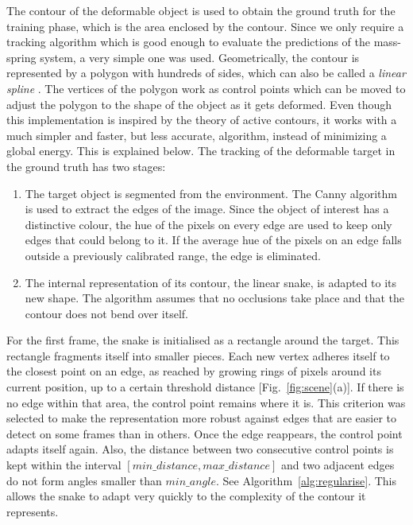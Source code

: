 \documentclass[journal]{IEEEtran}
\newcommand{\fref}[1]{Fig.~\ref{#1}}
\newcommand{\alref}[1]{Algorithm~\ref{#1}}
\newcounter{algorithm}
\newcommand{\comment}[1]{{\color{red} #1}}
\begin{document}
The contour of the deformable object is used to obtain the ground truth for the training phase, which is the area enclosed by the contour. \comment{Since we only require a tracking algorithm which is good enough to evaluate the predictions of the mass-spring system, a very simple one was used.}  Geometrically, the contour is represented by a polygon with hundreds of sides, which can also be called a \textit{linear spline} \comment{\cite{Menet1991}. The vertices of the polygon work as control points which can be moved to adjust the polygon to the shape of the object as it gets deformed.  Even though this implementation is inspired by the theory of active contours, it works with a much simpler and faster, but less accurate, algorithm, instead of minimizing a global energy. This is explained below.}  The tracking of the deformable target in the ground truth has two stages:
\begin{enumerate}
 \item The target object is segmented from the environment.  The Canny algorithm is used to extract the edges of the image.  \comment{  Since the object of interest has a distinctive colour, the hue of the pixels on every edge are used to keep only edges that could belong to it.  If the average hue of the pixels on an edge falls outside a previously calibrated range, the edge is eliminated.}
 \item The internal representation of its contour, the linear snake, is adapted to its new shape.  The algorithm assumes that no occlusions take place and that the contour does not bend over itself.
\end{enumerate}
For the first frame, the snake is initialised as a rectangle around the target. This rectangle fragments itself into smaller pieces. Each new vertex adheres itself to the closest point on an edge, as reached by growing rings of pixels around its current position, up to a certain threshold distance [\fref{fig:scene}(a)].  If there is no edge within that area, the control point remains where it is. This criterion was selected to make the representation more robust against edges that are easier to detect on some frames than in others.  Once the edge reappears, the control point adapts itself again.  Also, the distance between two consecutive control points is kept within the interval $[min\_distance, max\_distance]$ and two adjacent edges do not form angles smaller than $min\_angle$.  See \alref{alg:regularise}.  This allows the snake to adapt very quickly to the complexity of the contour it represents.
\end{document}
